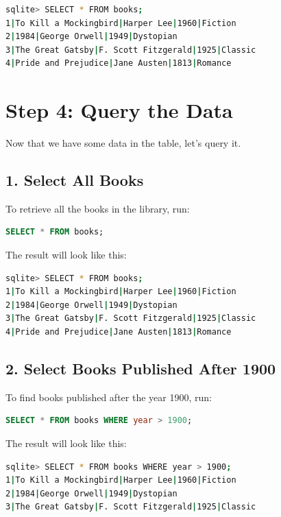 \documentclass{article}
\begin{document}
\begin{lstlisting}[language=bash]
sqlite> SELECT * FROM books;
1|To Kill a Mockingbird|Harper Lee|1960|Fiction
2|1984|George Orwell|1949|Dystopian
3|The Great Gatsby|F. Scott Fitzgerald|1925|Classic
4|Pride and Prejudice|Jane Austen|1813|Romance
\end{lstlisting}

\section*{Step 4: Query the Data}

Now that we have some data in the table, let's query it.

\subsection*{1. Select All Books}

To retrieve all the books in the library, run:

\begin{lstlisting}[language=SQL]
SELECT * FROM books;
\end{lstlisting}

The result will look like this:

\begin{lstlisting}[language=bash]
sqlite> SELECT * FROM books;
1|To Kill a Mockingbird|Harper Lee|1960|Fiction
2|1984|George Orwell|1949|Dystopian
3|The Great Gatsby|F. Scott Fitzgerald|1925|Classic
4|Pride and Prejudice|Jane Austen|1813|Romance
\end{lstlisting}

\subsection*{2. Select Books Published After 1900}

To find books published after the year 1900, run:

\begin{lstlisting}[language=SQL]
SELECT * FROM books WHERE year > 1900;
\end{lstlisting}

The result will look like this:

\begin{lstlisting}[language=bash]
sqlite> SELECT * FROM books WHERE year > 1900;
1|To Kill a Mockingbird|Harper Lee|1960|Fiction
2|1984|George Orwell|1949|Dystopian
3|The Great Gatsby|F. Scott Fitzgerald|1925|Classic
\end{lstlisting}
\end{document}
